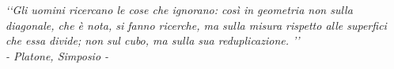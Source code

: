 \documentclass[a4paper,11pt,oneside]{report}
\begin{document}


\qquad
 \pagestyle{empty}
\newpage

\begin{flushright}
\vspace*{3cm}
\emph{ \lq\lq Gli uomini ricercano le cose che ignorano: così in geometria non sulla diagonale, che è nota, si fanno ricerche, ma sulla misura rispetto alle superfici che essa divide; non sul cubo, ma sulla sua reduplicazione. \rq\rq \\ - Platone, Simposio -}
\end{flushright}


\qquad
 \pagestyle{empty}
\newpage
\qquad
 \pagestyle{empty}
\newpage








\pagestyle{fancy}  %
 \tableofcontents



\qquad
 \pagestyle{empty}
\newpage
\qquad
\pagestyle{empty}
\newpage




\newpage
\pagestyle{fancy} 










%





\newpage
\end{document}
